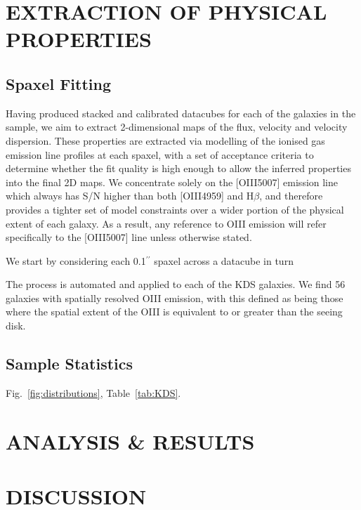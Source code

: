 \documentclass[a4paper,fleqn,usenatbib]{mn2e}
\begin{document}
\section{EXTRACTION OF PHYSICAL PROPERTIES}
\subsection{Spaxel Fitting}
Having produced stacked and calibrated datacubes for each of the galaxies in the sample, we aim to extract 2-dimensional maps of the flux, velocity and velocity dispersion.
These properties are extracted via modelling of the ionised gas emission line profiles at each spaxel, with a set of acceptance criteria to determine whether the fit quality is high enough to allow the inferred properties into the final 2D maps.
We concentrate solely on the [OIII5007] emission line which always has S/N higher than both [OIII4959] and H$\beta$, and therefore provides a tighter set of model constraints over a wider portion of the physical extent of each galaxy.
As a result, any reference to OIII emission will refer specifically to the [OIII5007] line unless otherwise stated.

We start by considering each 0.1$^{\prime\prime}$ spaxel across a datacube in turn 




The process is automated and applied to each of the KDS galaxies.
We find 56 galaxies with spatially resolved OIII emission, with this defined as being those where the spatial extent of the OIII is equivalent to or greater than the seeing disk.





  




\subsection{Sample Statistics}



Fig.~\ref{fig:distributions}, Table~\ref{tab:KDS}.



\section{ANALYSIS \& RESULTS}



\section{DISCUSSION}
\end{document}
